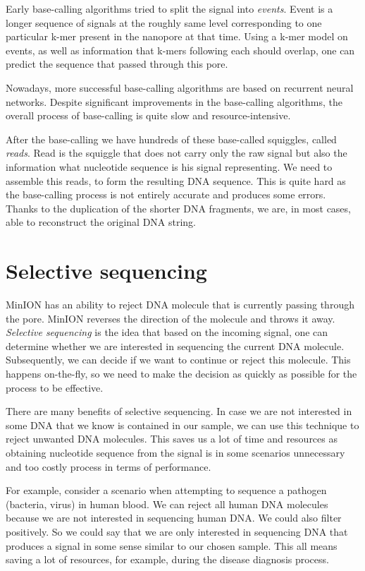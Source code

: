 Early base-calling algorithms tried to split the signal into \textit{events}\cite{david2017nanocall}.
Event is a longer sequence of signals at the roughly same level corresponding
to one particular k-mer present in the nanopore at that time. Using a k-mer model on events, as well as information
that k-mers following each should overlap, one can predict the sequence that passed through this pore.

Nowadays, more successful base-calling algorithms are based on recurrent neural
networks. Despite significant improvements in the base-calling algorithms, the overall
process of base-calling is quite slow and resource-intensive.

After the base-calling we have hundreds of these base-called squiggles, called \textit{reads}.
Read is the squiggle that does not carry only the raw signal but also the information
what nucleotide sequence is his signal representing. We need to assemble this reads,
to form the resulting DNA sequence. This is quite hard as the base-calling process is not entirely
accurate and produces some errors. Thanks to the duplication of the shorter DNA
fragments, we are, in most cases, able to reconstruct the original DNA string.

\section{Selective sequencing}

MinION has an ability to reject DNA molecule that is currently passing through
the pore. MinION reverses the direction of the molecule and throws it away.
\textit{Selective sequencing} is the idea that based on the incoming signal, one can determine
whether we are interested in sequencing the current DNA molecule. Subsequently, we can decide if we want
to continue or reject this molecule. This happens on-the-fly, so we need to make
the decision as quickly as possible for the process to be effective.

There are many benefits of selective sequencing. In case we are not interested
in some DNA that we know is contained in our sample, we can use this technique to
reject unwanted DNA molecules. This saves us a lot of time and resources as obtaining
nucleotide sequence from the signal is in some scenarios unnecessary and too
costly process in terms of performance.

For example, consider a scenario when attempting to sequence a pathogen (bacteria, virus) in human blood. We can
reject all human DNA molecules because we are not interested in sequencing human
DNA. We could also filter positively. So we could say that we are only
interested in sequencing DNA that produces a signal in some sense similar to our
chosen sample. This all means saving a lot of resources, for example, during the disease diagnosis process.


